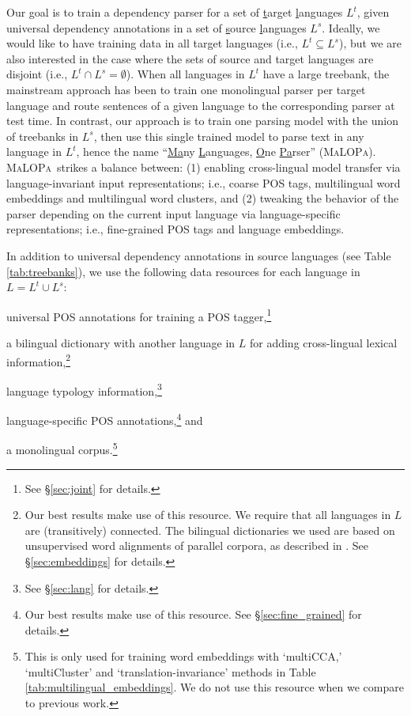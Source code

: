 \documentclass[11pt]{article}
\newcommand{\malopa}{\textsc{MaLOPa}}
\newenvironment{itemizesquish}{\begin{list}{\labelitemi}{\setlength{\itemsep}{0em}\setlength{\labelwidth}{0.5em}\setlength{\leftmargin}{\labelwidth}\addtolength{\leftmargin}{\labelsep}}}{\end{list}}
\begin{document}
Our goal is to train a dependency parser for a set of \underline{t}arget \underline{l}anguages ${L}^t$, given universal dependency annotations in a set of \underline{s}ource \underline{l}anguages ${L}^s$.
Ideally, we would like to have training data in all target languages (i.e., $L^t \subseteq L^s$), but we are also interested in the case where the sets of source and target languages are disjoint (i.e., $L^t \cap L^s = \emptyset$).
When all languages in $L^t$ have a large treebank, the mainstream approach has been to train one monolingual parser per target language and route sentences of a given language to the corresponding parser at test time.
In contrast, our approach is to train one parsing model with the union of treebanks in $L^s$, then use this single trained model to parse text in any language in $L^t$, hence the name ``\underline{Ma}ny \underline{L}anguages, \underline{O}ne \underline{Pa}rser'' (\malopa).
\malopa~strikes a balance between:
(1) enabling cross-lingual model transfer via language-invariant input representations; i.e., coarse POS tags, multilingual word embeddings and multilingual word clusters, and
(2) tweaking the behavior of the parser depending on the current input language via language-specific representations; i.e., fine-grained POS tags and language embeddings.

In addition to universal dependency annotations in source languages (see Table \ref{tab:treebanks}), we use the following data resources for each language in ${L} = {L}^t \cup {L}^s$:
\begin{itemizesquish}
\item universal POS annotations for training a POS tagger,\footnote{See \S\ref{sec:joint} for details.}
\item a bilingual dictionary with another language in $L$ for adding cross-lingual lexical information,\footnote{Our best results make use of this resource. We require that all languages in $L$ are (transitively) connected. The bilingual dictionaries we used are based on unsupervised word alignments of parallel corpora, as described in . See \S\ref{sec:embeddings} for details.}
\item language typology information,\footnote{See \S\ref{sec:lang} for details.}
\item language-specific POS annotations,\footnote{Our best results make use of this resource. See \S\ref{sec:fine_grained} for details.} and
\item a monolingual corpus.\footnote{This is only used for training word embeddings with `multiCCA,' `multiCluster' and `translation-invariance' methods in Table \ref{tab:multilingual_embeddings}. We do not use this resource when we compare to previous work.}
\end{itemizesquish}
\end{document}
